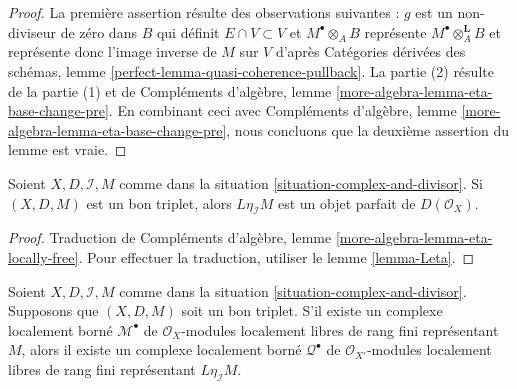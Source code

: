 \begin{proof}
La première assertion résulte des observations suivantes :
$g$ est un non-diviseur de zéro dans $B$ qui définit $E \cap V \subset V$
et $M^\bullet \otimes_A B$ représente $M^\bullet \otimes_A^\mathbf{L} B$
et représente donc l'image inverse de $M$ sur $V$ d'après
Catégories dérivées des schémas, lemme
\ref{perfect-lemma-quasi-coherence-pullback}.
La partie (2) résulte de la partie (1) et de
Compléments d'algèbre, lemme \ref{more-algebra-lemma-eta-base-change-pre}.
En combinant ceci avec
Compléments d'algèbre, lemme \ref{more-algebra-lemma-eta-base-change-pre},
nous concluons que la deuxième assertion du lemme est vraie.
\end{proof}

\begin{lemma}
\label{lemma-good-triple}
Soient $X, D, \mathcal{I}, M$ comme dans la
situation \ref{situation-complex-and-divisor}.
Si $(X, D, M)$ est un bon triplet, alors
$L\eta_\mathcal{I}M$ est un objet parfait
de $D(\mathcal{O}_X)$.
\end{lemma}

\begin{proof}
Traduction de
Compléments d'algèbre, lemme \ref{more-algebra-lemma-eta-locally-free}.
Pour effectuer la traduction, utiliser le lemme \ref{lemma-Leta}.
\end{proof}

\begin{lemma}
\label{lemma-good-triple-bdd-loc-free}
Soient $X, D, \mathcal{I}, M$ comme dans la
situation \ref{situation-complex-and-divisor}.
Supposons que $(X, D, M)$ soit un bon triplet.
S'il existe un complexe localement borné $\mathcal{M}^\bullet$
de $\mathcal{O}_X$-modules localement libres de rang fini représentant $M$,
alors il existe un complexe localement borné $\mathcal{Q}^\bullet$
de $\mathcal{O}_{X'}$-modules localement libres de rang fini représentant
$L\eta_\mathcal{I}M$.
\end{lemma}

